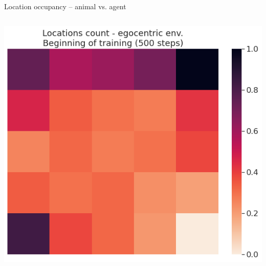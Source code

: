 \documentclass[bigger]{beamer}
\begin{document}
\begin{frame}[label={sec:org25af807}]{Location occupancy -- animal vs. agent}
\begin{columns}
\begin{column}{0.5\columnwidth}
\begin{center}
\end{center}
\begin{center}
\includegraphics[height=0.4\textheight]{img/q-learning_ego_locations_count_500steps_all_cues.png}
\end{center}
\end{column}
\end{columns}
\end{frame}
\end{document}

